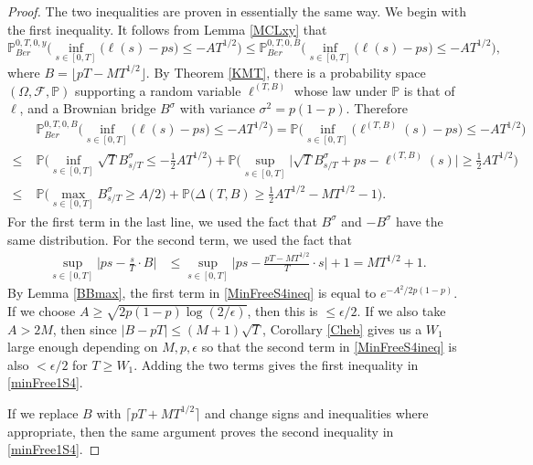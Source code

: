 \begin{proof}
	The two inequalities are proven in essentially the same way. We begin with the first inequality. It follows from Lemma \ref{MCLxy} that
	\[
	\mathbb{P}^{0,T,0,y}_{Ber}\Big( \inf_{s \in [ 0, T]}\big( \ell(s) -  ps \big) \leq -AT^{1/2} \Big) \leq \mathbb{P}^{0,T,0,B}_{Ber}\Big( \inf_{s \in [ 0, T]}\big( \ell(s) -  ps \big) \leq -AT^{1/2} \Big),
	\]
	where $B=\lfloor pT - MT^{1/2}\rfloor$. By Theorem \ref{KMT}, there is a probability space $(\Omega,\mathcal{F},\mathbb{P})$ supporting a random variable $\ell^{(T,B)}$ whose law under $\mathbb{P}$ is that of $\ell$, and a Brownian bridge $B^\sigma$ with variance $\sigma^2 = p(1-p)$. Therefore
	\begin{align}
	&\mathbb{P}^{0,T,0,B}_{Ber}\Big( \inf_{s \in [ 0, T]}\big( \ell(s) -  ps \big) \leq -AT^{1/2} \Big) = \mathbb{P}\Big( \inf_{s \in [ 0, T]}\big( \ell^{(T,B)}(s) -  ps \big) \leq -AT^{1/2} \Big)\nonumber\\
	\leq \; & \mathbb{P}\Big( \inf_{s \in [ 0, T]}  \sqrt{T}B^\sigma_{s/T} \leq -\frac{1}{2}AT^{1/2} \Big) + \mathbb{P}\Big( \sup_{s\in [0,T]} \Big|\sqrt{T} B^\sigma_{s/T} + ps - \ell^{(T,B)}(s) \Big| \geq \frac{1}{2}AT^{1/2} \Big)\nonumber\\
	\leq \; & \mathbb{P}\Big( \max_{s\in[0,T]} B^\sigma_{s/T} \geq A/2 \Big) + \mathbb{P}\Big(\Delta(T,B) \geq \frac{1}{2}AT^{1/2} - MT^{1/2} - 1\Big). \label{MinFreeS4ineq}
	\end{align}
	For the first term in the last line, we used the fact that $B^\sigma$ and $-B^\sigma$ have the same distribution. For the second term, we used the fact that
	\begin{align*}
	\sup_{s\in[0,T]}\Big| ps - \frac{s}{T}\cdot B \Big| &\leq \sup_{s\in[0,T]}\Big| ps - \frac{pT-MT^{1/2}}{T}\cdot s \Big| + 1 = MT^{1/2} + 1.
	\end{align*}
	By Lemma \ref{BBmax}, the first term in \eqref{MinFreeS4ineq} is equal to $e^{-A^2/2p(1-p)}$. If we choose $A \geq \sqrt{2p(1-p)\log(2/\epsilon)}$, then this is $\leq \epsilon/2$. If we also take $A > 2M$, then since $|B-pT| \leq (M+1)\sqrt{T}$, Corollary \ref{Cheb} gives us a $W_1$ large enough depending on $M,p,\epsilon$ so that the second term in \eqref{MinFreeS4ineq} is also $<\epsilon/2$ for $T\geq W_1$. Adding the two terms gives the first inequality in \eqref{minFree1S4}.
	
	If we replace $B$ with $\lceil pT + MT^{1/2} \rceil$ and change signs and inequalities where appropriate, then the same argument proves the second inequality in \eqref{minFree1S4}.
\end{proof}

